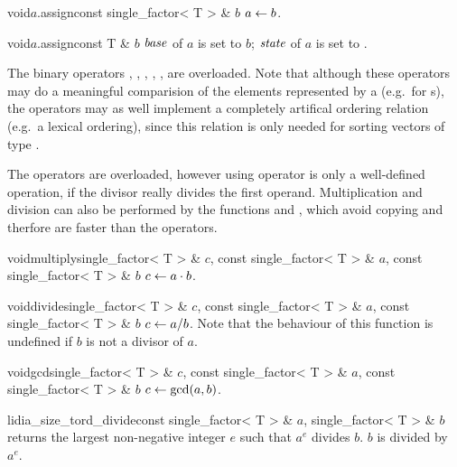\begin{fcode}{void}{$a$.assign}{const single_factor< T > & $b$}
  $a \leftarrow b$.
\end{fcode}

\begin{fcode}{void}{$a$.assign}{const T & $b$}
  $\mathit{base}$ of $a$ is set to $b$; $\mathit{state}$ of $a$ is set to .
\end{fcode}



\COMP

The binary operators \code{==}, \code{!=}, \code{<}, \code{<=}, \code{>=}, \code{>} are
overloaded.  Note that although these operators may do a meaningful comparision of the elements
represented by a  (e.g.~for s), the operators may as well
implement a completely artifical ordering relation (e.g.~a lexical ordering), since this
relation is only needed for sorting vectors of type .



\ARTH

The operators  are overloaded, however using operator \code{/} is only a
well-defined operation, if the divisor really divides the first operand.  Multiplication and
division can also be performed by the functions  and , which avoid
copying and therfore are faster than the operators.

\begin{fcode}{void}{multiply}{single_factor< T > & $c$, const single_factor< T > & $a$, const single_factor< T > & $b$}
  $c \leftarrow a \cdot b$.
\end{fcode}

\begin{fcode}{void}{divide}{single_factor< T > & $c$, const single_factor< T > & $a$, const single_factor< T > & $b$}
  $c \leftarrow a / b$.  Note that the behaviour of this function is undefined if $b$ is not a divisor of
  $a$.
\end{fcode}

\begin{fcode}{void}{gcd}{single_factor< T > & $c$, const single_factor< T > & $a$, const single_factor< T > & $b$}
  $c \leftarrow \gcd(a,b)$.
\end{fcode}

\begin{fcode}{lidia_size_t}{ord_divide}{const single_factor< T > & $a$, single_factor< T > & $b$}
  returns the largest non-negative integer $e$ such that $a^e$ divides $b$.  $b$ is divided by
  $a^e$.
\end{fcode}


